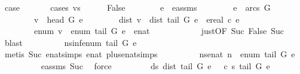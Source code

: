 \begin{isabellebody}
\ {\isacharquery}case\ \isanewline
\ \ \ \ \isamarkupfalse%
\ {\isacharparenleft}cases\ {\isachardoublequoteopen}v{\isacharequal}s{\isachardoublequoteclose}{\isacharparenright}\isanewline
\ \ \ \ \isamarkupfalse%
\ False\isanewline
\ \ \ \ \ \ \isamarkupfalse%
\ e\ \ e{\isacharunderscore}assms{\isacharcolon}\isanewline
\ \ \ \ \ \ \ \ {\isachardoublequoteopen}e\ {\isasymin}\ arcs\ G{\isachardoublequoteclose}\ \isanewline
\ \ \ \ \ \ \ \ {\isachardoublequoteopen}v\ {\isacharequal}\ head\ G\ e{\isachardoublequoteclose}\isanewline
\ \ \ \ \ \ \ \ {\isachardoublequoteopen}dist\ v\ {\isacharequal}\ dist\ {\isacharparenleft}tail\ G\ e{\isacharparenright}\ {\isacharplus}\ ereal\ {\isacharparenleft}c\ e{\isacharparenright}{\isachardoublequoteclose}\ \isanewline
\ \ \ \ \ \ \ \ {\isachardoublequoteopen}enum\ v\ {\isacharequal}\ enum\ {\isacharparenleft}tail\ G\ e{\isacharparenright}\ {\isacharplus}\ enat\ {}{\isachardoublequoteclose}\ \isanewline
\ \ \ \ \ \ \ \ \isamarkupfalse%
\ just{\isacharbrackleft}OF\ Suc{\isacharparenleft}{}{\isacharparenright}\ False\ Suc{\isacharparenleft}{}{\isacharparenright}{\isacharbrackright}\ \isamarkupfalse%
\ blast\isanewline
\ \ \ \ \ \ \isamarkupfalse%
\ \isamarkupfalse%
\ nsinf{\isacharcolon}{\isachardoublequoteopen}enum\ {\isacharparenleft}tail\ G\ e{\isacharparenright}\ {\isasymnoteq}\ {\isasyminfinity}{\isachardoublequoteclose}\ \isanewline
\ \ \ \ \ \ \ \ \isamarkupfalse%
\ {\isacharparenleft}metis\ Suc{\isacharparenleft}{}{\isacharparenright}\ enat{\isachardot}simps{\isacharparenleft}{}{\isacharparenright}\ enat{\isacharunderscore}{}\ plus{\isacharunderscore}enat{\isacharunderscore}simps{\isacharparenleft}{}{\isacharparenright}{\isacharparenright}\isanewline
\ \ \ \ \ \ \isamarkupfalse%
\ \isamarkupfalse%
\ ns{\isacharcolon}{\isachardoublequoteopen}enat\ n\ {\isacharequal}\ enum\ {\isacharparenleft}tail\ G\ e{\isacharparenright}{\isachardoublequoteclose}\ \isanewline
\ \ \ \ \ \ \ \ \isamarkupfalse%
\ e{\isacharunderscore}assms{\isacharparenleft}{}{\isacharparenright}\ Suc{\isacharparenleft}{}{\isacharparenright}\ \isamarkupfalse%
\ force\isanewline
\ \ \ \ \ \ \isamarkupfalse%
\ \ ds{\isacharcolon}\ {\isachardoublequoteopen}dist\ {\isacharparenleft}tail\ G\ e{\isacharparenright}\ {\isacharequal}\ {\isasymmu}\ c\ s\ {\isacharparenleft}tail\ G\ e{\isacharparenright}{\isachardoublequoteclose}\ \isanewline

\end{isabellebody}
